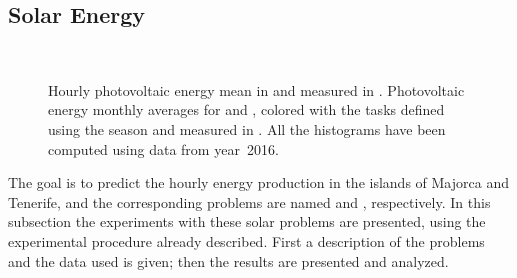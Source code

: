 \subsection{Solar Energy}

\begin{figure}[t!]
    \centering%
    \quad%
    \\
    \quad%
 \caption{\label{fig:solar_task_def}Hourly photovoltaic energy mean {in}  {and}  measured in \mwhu{}. Photovoltaic energy monthly averages for  and , colored with the tasks defined using the season and measured in \mwhu{}. All the histograms have been computed using data from year~2016.}
 \end{figure}

The goal is to predict the hourly energy production in the islands of Majorca and Tenerife, and the corresponding problems are named  and , respectively. 
%
In this subsection the experiments with these solar problems are presented, using the experimental procedure already described. First a description of the problems and the data used is given; then the results are presented and analyzed.

